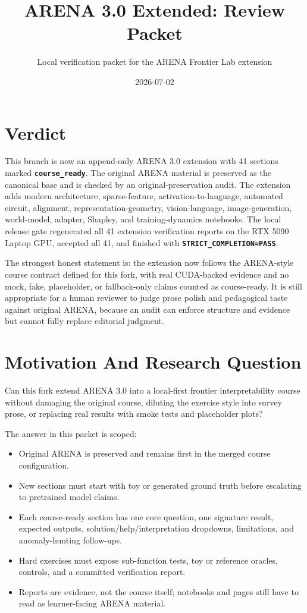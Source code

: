 \documentclass[11pt]{article}
\title{ARENA 3.0 Extended: Review Packet}
\author{Local verification packet for the ARENA Frontier Lab extension}
\date{2026-07-02}
\newcommand{\status}[1]{\textbf{\texttt{#1}}}
\begin{document}
\maketitle

\section*{Verdict}
This branch is now an append-only ARENA 3.0 extension with 41 sections marked
\status{course\_ready}. The original ARENA material is preserved as the
canonical base and is checked by an original-preservation audit. The extension
adds modern architecture, sparse-feature, activation-to-language, automated
circuit, alignment, representation-geometry, vision-language, image-generation,
world-model, adapter, Shapley, and training-dynamics notebooks. The local
release gate regenerated all 41 extension verification reports on the RTX 5090
Laptop GPU, accepted all 41, and finished with \status{STRICT\_COMPLETION=PASS}.

The strongest honest statement is: the extension now follows the ARENA-style
course contract defined for this fork, with real CUDA-backed evidence and no
mock, fake, placeholder, or fallback-only claims counted as course-ready. It is
still appropriate for a human reviewer to judge prose polish and pedagogical
taste against original ARENA, because an audit can enforce structure and
evidence but cannot fully replace editorial judgment.

\section{Motivation And Research Question}
Can this fork extend ARENA 3.0 into a local-first frontier interpretability
course without damaging the original course, diluting the exercise style into
survey prose, or replacing real results with smoke tests and placeholder plots?

The answer in this packet is scoped:
\begin{itemize}
  \item Original ARENA is preserved and remains first in the merged course
  configuration.
  \item New sections must start with toy or generated ground truth before
  escalating to pretrained model claims.
  \item Each course-ready section has one core question, one signature result,
  expected outputs, solution/help/interpretation dropdowns, limitations, and
  anomaly-hunting follow-ups.
  \item Hard exercises must expose sub-function tests, toy or reference oracles,
  controls, and a committed verification report.
  \item Reports are evidence, not the course itself; notebooks and pages still
  have to read as learner-facing ARENA material.
\end{itemize}
\end{document}
